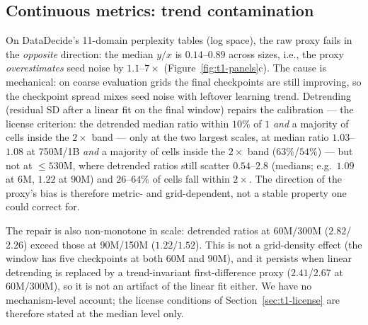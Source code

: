 \subsection{Continuous metrics: trend contamination}
\label{app:t1-ppl}

On DataDecide's 11-domain perplexity tables (log space), the raw proxy fails in the
\emph{opposite} direction: the median $y/x$ is $0.14$--$0.89$ across sizes, i.e., the proxy
\emph{overestimates} seed noise by $1.1$--$7\times$ (Figure~\ref{fig:t1-panels}c). The cause is mechanical: on coarse
evaluation grids the final checkpoints are still improving, so the checkpoint spread mixes seed
noise with leftover learning trend. Detrending (residual SD after a linear fit on the final
window) repairs the calibration --- the license criterion: the detrended median ratio within $10\%$ of $1$ \emph{and} a majority of cells inside the $2\times$ band --- only at the two largest scales, at median ratio
$1.03$--$1.08$ at 750M/1B \emph{and} a majority of cells inside the $2\times$ band
($63\%$/$54\%$) --- but not at $\le 530$M, where detrended ratios still scatter $0.54$--$2.8$
(medians; e.g.\ $1.09$ at 6M, $1.22$ at 90M) and $26$--$64\%$ of cells fall
within $2\times$. The direction of the proxy's bias is therefore metric- and grid-dependent,
not a stable property one could correct for.

The repair is also non-monotone in scale: detrended ratios at 60M/300M ($2.82$/$2.26$) exceed
those at 90M/150M ($1.22$/$1.52$). This is not a grid-density effect (the window has five
checkpoints at both 60M and 90M), and it persists when linear detrending is replaced by a
trend-invariant first-difference proxy ($2.41$/$2.67$ at 60M/300M), so it is not an artifact
of the linear fit either. We have no mechanism-level account; the license conditions of
Section~\ref{sec:t1-license} are therefore stated at the median level only.

